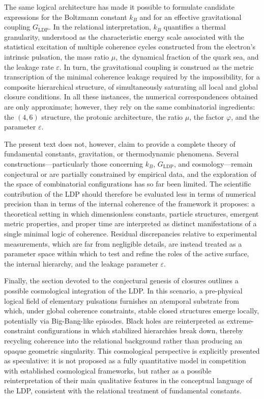 \documentclass[11pt,a4paper]{article}
\begin{document}
The same logical architecture has made it possible to formulate candidate expressions for the Boltzmann constant \(k_{B}\) and for an effective gravitational coupling \(G_{\mathrm{LDP}}\). In the relational interpretation, \(k_{B}\) quantifies a thermal granularity, understood as the characteristic energy scale associated with the statistical excitation of multiple coherence cycles constructed from the electron’s intrinsic pulsation, the mass ratio \(\mu\), the dynamical fraction of the quark sea, and the leakage rate \(\varepsilon\). In turn, the gravitational coupling is construed as the metric transcription of the minimal coherence leakage required by the impossibility, for a composite hierarchical structure, of simultaneously saturating all local and global closure conditions. In all these instances, the numerical correspondences obtained are only approximate; however, they rely on the same combinatorial ingredients: the \((4,6)\) structure, the protonic architecture, the ratio \(\mu\), the factor \(\varphi\), and the parameter \(\varepsilon\). 

The present text does not, however, claim to provide a complete theory of fundamental constants, gravitation, or thermodynamic phenomena. Several constructions—particularly those concerning \(k_{B}\), \(G_{\mathrm{LDP}}\), and cosmology—remain conjectural or are partially constrained by empirical data, and the exploration of the space of combinatorial configurations has so far been limited. The scientific contribution of the LDP should therefore be evaluated less in terms of numerical precision than in terms of the internal coherence of the framework it proposes: a theoretical setting in which dimensionless constants, particle structures, emergent metric properties, and proper time are interpreted as distinct manifestations of a single minimal logic of coherence. Residual discrepancies relative to experimental measurements, which are far from negligible details, are instead treated as a parameter space within which to test and refine the roles of the active surface, the internal hierarchy, and the leakage parameter \(\varepsilon\). 

Finally, the section devoted to the conjectural genesis of closures outlines a possible cosmological integration of the LDP. In this scenario, a pre-physical logical field of elementary pulsations furnishes an atemporal substrate from which, under global coherence constraints, stable closed structures emerge locally, potentially via Big-Bang-like episodes. Black holes are reinterpreted as extreme-constraint configurations in which stabilized hierarchies break down, thereby recycling coherence into the relational background rather than producing an opaque geometric singularity. This cosmological perspective is explicitly presented as speculative: it is not proposed as a fully quantitative model in competition with established cosmological frameworks, but rather as a possible reinterpretation of their main qualitative features in the conceptual language of the LDP, consistent with the relational treatment of fundamental constants.
\end{document}
